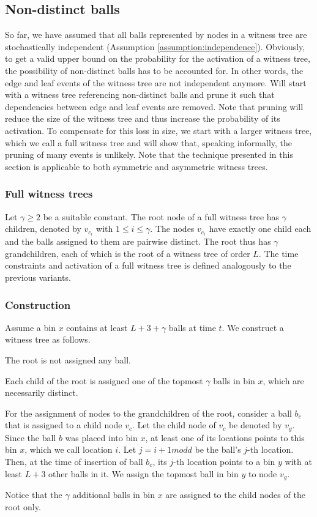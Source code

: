 \documentclass[a4paper,12pt]{article}
\begin{document}
\subsection{Non-distinct balls}
\label{sec:analysis:nondistinctBalls}
So far, we have assumed that all balls represented by nodes in a witness tree are stochastically independent (Assumption \ref{assumption:independence}). Obviously, to get a valid upper bound on the probability for the activation of a witness tree, the possibility of non-distinct balls has to be accounted for. In other words, the edge and leaf events of the witness tree are not independent anymore. Will start with a witness tree referencing non-distinct balls and prune it such that dependencies between edge and leaf events are removed. Note that pruning will reduce the size of the witness tree and thus increase the probability of its activation. To compensate for this loss in size, we start with a larger witness tree, which we call a full witness tree and will show that, speaking informally, the pruning of many events is unlikely. Note that the technique presented in this section is applicable to both symmetric and asymmetric witness trees. 

\subsubsection{Full witness trees}
\label{sec:analysis:FullWT}
Let $\gamma \geq 2$ be a suitable constant. The root node of a full witness tree has $\gamma$ children, denoted by $v_{c_i}$ with $1\leq i \leq \gamma$. The nodes $v_{c_i}$ have exactly one child each and the balls assigned to them are pairwise distinct. The root thus has $\gamma$ grandchildren, each of which is the root of a witness tree of order $L$. The time constraints and activation of a full witness tree is defined analogously to the previous variants.

\subsubsection{Construction}
\label{sec:analysis:constructionFullWT}
Assume a bin $x$ contains at least $L+3+\gamma$ balls at time $t$. We construct a witness tree as follows.
\begin{compactitem}
\item The root is not assigned any ball.
\item Each child of the root is assigned one of the topmost $\gamma$ balls in bin $x$, which are necessarily distinct.
\item For the assignment of nodes to the grandchildren of the root, consider a ball $b_c$ that is assigned to a child node $v_c$. Let the child node of $v_c$ be denoted by $v_g$. Since the ball $b$ was placed into bin $x$, at least one of its locations points to this bin $x$, which we call location $i$. Let $j = i+1 mod d$ be the ball's $j$-th location. Then, at the time of insertion of ball $b_c$, its $j$-th location points to a bin $y$ with at least $L+3$ other balls in it. We assign the topmost ball in bin $y$ to node $v_g$.
\end{compactitem}
Notice that the $\gamma$ additional balls in bin $x$ are assigned to the child nodes of the root only. 
\end{document}
